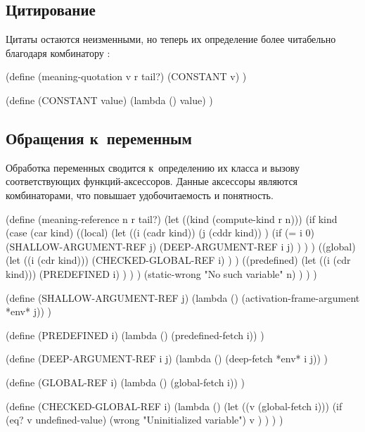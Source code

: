 \subsection{Цитирование}\label{fast/dilute/ssect:quoting}

Цитаты остаются неизменными, но теперь их определение более читабельно благодаря
комбинатору :

\begin{code:lisp}
(define (meaning-quotation v r tail?)
  (CONSTANT v) )

(define (CONSTANT value)
  (lambda () value) )
\end{code:lisp}


\subsection{Обращения к~переменным}\label{fast/dilute/ssect:refs}

Обработка переменных сводится к~определению их класса и вызову соответствующих
функций-аксессоров. Данные аксессоры являются комбинаторами, что повышает
удобочитаемость и понятность.

\begin{code:lisp}
(define (meaning-reference n r tail?)
  (let ((kind (compute-kind r n)))
    (if kind
        (case (car kind)
          ((local)
           (let ((i (cadr kind))
                 (j (cddr kind)) )
             (if (= i 0)
                 (SHALLOW-ARGUMENT-REF j)
                 (DEEP-ARGUMENT-REF i j) ) ) )
          ((global)
           (let ((i (cdr kind)))
             (CHECKED-GLOBAL-REF i) ) )
          ((predefined)
           (let ((i (cdr kind)))
             (PREDEFINED i) ) ) )
        (static-wrong "No such variable" n) ) ) )

(define (SHALLOW-ARGUMENT-REF j)
  (lambda () (activation-frame-argument *env* j)) )

(define (PREDEFINED i)
  (lambda () (predefined-fetch i)) )

(define (DEEP-ARGUMENT-REF i j)
  (lambda () (deep-fetch *env* i j)) )

(define (GLOBAL-REF i)
  (lambda () (global-fetch i)) )

(define (CHECKED-GLOBAL-REF i)
  (lambda ()
    (let ((v (global-fetch i)))
      (if (eq? v undefined-value)
          (wrong "Uninitialized variable")
          v ) ) ) )
\end{code:lisp}

